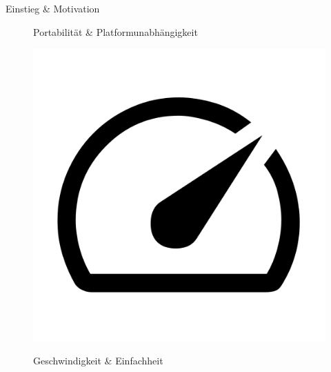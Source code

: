 \begin{frame}{Einstieg \& Motivation}
\begin{figure}[h]
\begin{minipage}{.32\textwidth}
\begin{center}
				{\small Portabilität \& Platformunabhängigkeit}
			\end{center}
		\end{minipage}
		\pause
		\hfill
		\begin{minipage}{.32\textwidth}
			\begin{center}
				\centerline{\includegraphics[width=.5\textwidth]{assets/google_icon_speed.png}}
				{\small Geschwindigkeit \& Einfachheit }
			\end{center}
		\end{minipage}
	\end{figure}
\end{frame}

